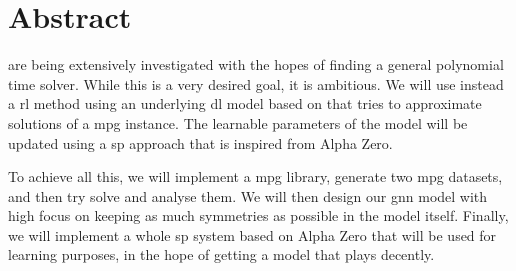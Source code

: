 \chapter*{Abstract}
 are being extensively investigated with the hopes of finding a general polynomial time solver. While this is a very desired goal, it is ambitious. We will use instead a \acrfull{rl} method using an underlying \acrfull{dl} model based on  that tries to approximate solutions of a \acrshort{mpg} instance. The learnable parameters of the model will be updated using a \acrfull{sp} approach that is inspired from Alpha Zero.

To achieve all this, we will implement a \acrshort{mpg} library, generate two \acrshort{mpg} datasets, and then try solve and analyse them.  We will then design our \acrshort{gnn} model with high focus on keeping as much symmetries as possible in the model itself. Finally, we will implement a whole \acrshort{sp} system based on Alpha Zero that will be used for learning purposes, in the hope of getting a model that plays decently. 